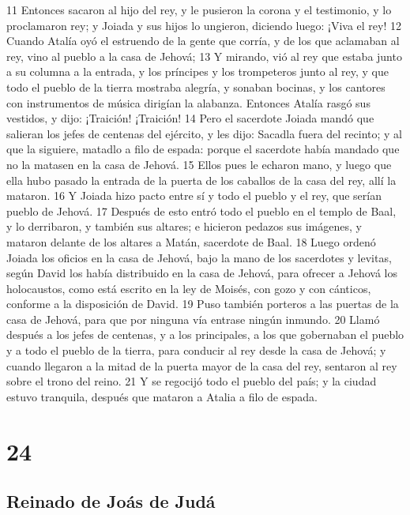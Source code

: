 11 Entonces sacaron al hijo del rey, y le pusieron la corona y el testimonio, y lo proclamaron rey; y Joiada y sus hijos lo ungieron, diciendo luego: ¡Viva el rey!
12 Cuando Atalía oyó el estruendo de la gente que corría, y de los que aclamaban al rey, vino al pueblo a la casa de Jehová;
13 Y mirando, vió al rey que estaba junto a su columna a la entrada, y los príncipes y los trompeteros junto al rey, y que todo el pueblo de la tierra mostraba alegría, y sonaban bocinas, y los cantores con instrumentos de música dirigían la alabanza. Entonces Atalía rasgó sus vestidos, y dijo: ¡Traición! ¡Traición!
14 Pero el sacerdote Joiada mandó que salieran los jefes de centenas del ejército, y les dijo: Sacadla fuera del recinto; y al que la siguiere, matadlo a filo de espada: porque el sacerdote había mandado que no la matasen en la casa de Jehová.
15 Ellos pues le echaron mano, y luego que ella hubo pasado la entrada de la puerta de los caballos de la casa del rey, allí la mataron.
16 Y Joiada hizo pacto entre sí y todo el pueblo y el rey, que serían pueblo de Jehová.
17 Después de esto entró todo el pueblo en el templo de Baal, y lo derribaron, y también sus altares; e hicieron pedazos sus imágenes, y mataron delante de los altares a Matán, sacerdote de Baal.
18 Luego ordenó Joiada los oficios en la casa de Jehová, bajo la mano de los sacerdotes y levitas, según David los había distribuido en la casa de Jehová, para ofrecer a Jehová los holocaustos, como está escrito en la ley de Moisés, con gozo y con cánticos, conforme a la disposición de David.
19 Puso también porteros a las puertas de la casa de Jehová, para que por ninguna vía entrase ningún inmundo.
20 Llamó después a los jefes de centenas, y a los principales, a los que gobernaban el pueblo y a todo el pueblo de la tierra, para conducir al rey desde la casa de Jehová; y cuando llegaron a la mitad de la puerta mayor de la casa del rey, sentaron al rey sobre el trono del reino.
21 Y se regocijó todo el pueblo del país; y la ciudad estuvo tranquila, después que mataron a Atalia a filo de espada.

\chapter{24}

\section*{Reinado de Joás de Judá}

